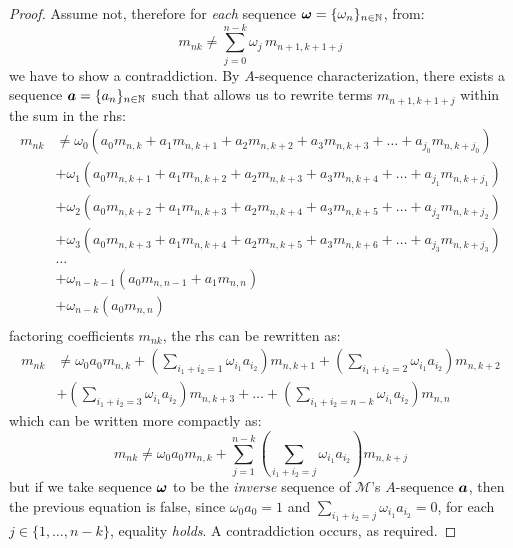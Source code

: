 \begin{proof}
    Assume not, therefore for \emph{each} sequence $\boldsymbol{\omega}=\lbrace \omega_{n}\rbrace_{n\in\mathbb{N}}$,
    from:
    \begin{displaymath}
        m_{nk}\neq\sum_{j=0}^{n-k}{\omega_{j}\,m_{n+1,k+1+j}}
    \end{displaymath}
    we have to show a contraddiction. By $A$-sequence characterization, 
    there exists a sequence $\boldsymbol{a}=\lbrace a_{n}\rbrace_{n\in\mathbb{N}}$
    such that allows us to rewrite terms $m_{n+1,k+1+j}$
    within the sum in the \ac{rhs}:
    \begin{displaymath}
        \begin{split}
            m_{nk} &\neq \omega_{0}\left(a_{0}m_{n,k}+a_{1}m_{n,k+1}+a_{2}m_{n,k+2}+a_{3}m_{n,k+3}+\ldots+a_{j_{0}}m_{n,k+j_{0}}\right)\\
                   &+ \omega_{1}\left(a_{0}m_{n,k+1}+a_{1}m_{n,k+2}+a_{2}m_{n,k+3}+a_{3}m_{n,k+4}+\ldots+a_{j_{1}}m_{n,k+j_{1}}\right)\\
                   &+ \omega_{2}\left(a_{0}m_{n,k+2}+a_{1}m_{n,k+3}+a_{2}m_{n,k+4}+a_{3}m_{n,k+5}+\ldots+a_{j_{2}}m_{n,k+j_{2}}\right)\\
                   &+ \omega_{3}\left(a_{0}m_{n,k+3}+a_{1}m_{n,k+4}+a_{2}m_{n,k+5}+a_{3}m_{n,k+6}+\ldots+a_{j_{3}}m_{n,k+j_{3}}\right)\\
                   &\ldots\\
                   &+ \omega_{n-k-1}\left(a_{0}m_{n,n-1}+a_{1}m_{n,n}\right)\\
                   &+ \omega_{n-k}\left(a_{0}m_{n,n}\right)\\
        \end{split}
    \end{displaymath}
    factoring coefficients $m_{nk}$, the \ac{rhs} can be rewritten as:
    \begin{displaymath}
        \begin{split}
            m_{nk}&\neq \omega_{0}a_{0}m_{n,k} + \left(\sum_{i_{1}+i_{2}=1}{\omega_{i_{1}}a_{i_{2}}}\right)m_{n,k+1}
                + \left(\sum_{i_{1}+i_{2}=2}{\omega_{i_{1}}a_{i_{2}}}\right)m_{n,k+2}\\
                &+ \left(\sum_{i_{1}+i_{2}=3}{\omega_{i_{1}}a_{i_{2}}}\right)m_{n,k+3}
                + \ldots 
                + \left(\sum_{i_{1}+i_{2}=n-k}{\omega_{i_{1}}a_{i_{2}}}\right)m_{n,n}
        \end{split}
    \end{displaymath}
    which can be written more compactly as:
    \begin{displaymath}
        m_{nk} \neq \omega_{0}a_{0}m_{n,k} +
            \sum_{j=1}^{n-k}{\left(\sum_{i_{1}+i_{2}=j}{\omega_{i_{1}}a_{i_{2}}}\right)m_{n,k+j}}
    \end{displaymath}
    but if we take sequence $\boldsymbol{\omega}$ to be the \emph{inverse} sequence of 
    $\mathcal{M}$'s $A$-sequence $\boldsymbol{a}$, then the previous equation is false,
    since $\omega_{0}a_{0}=1$ and $\sum_{i_{1}+i_{2}=j}{\omega_{i_{1}}a_{i_{2}}}=0$,
    for each $j\in\lbrace1,\ldots,n-k\rbrace$, equality \emph{holds}. 
    A contraddiction occurs, as required.        
\end{proof}

